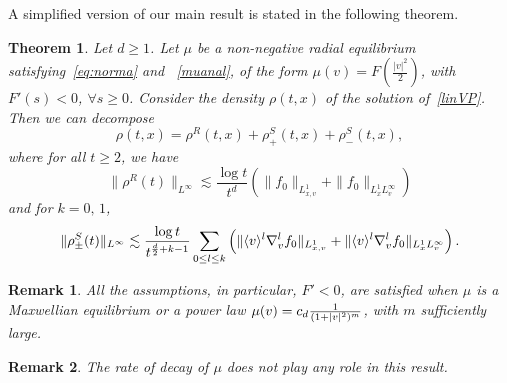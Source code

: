 \documentclass[11pt]{amsart}
\numberwithin{equation}{section}
\newcommand{\R}{\mathbb{R}}
\newtheorem{thm}{Theorem}[section]
\newtheorem{rem}{Remark}[section]
\begin{document}
A simplified version of our main result is stated in the following theorem.
\begin{thm}
\label{thm1}
Let $d\geq 1$. Let $\mu$ be a non-negative radial equilibrium satisfying~\eqref{eq:norma} and ~\eqref{muanal}, of the form
$\mu(v) = F\left(\frac{|v|^2}{2}\right)$, with $F'(s) <0$, $\forall s \geq 0$.
%
Consider the density   $\rho(t,x)$ of  the solution of~\eqref{linVP}.
Then we can decompose
$$ \rho(t,x) = \rho^{R}(t,x) + \rho^S_{+}(t,x) + \rho^S_{-}(t,x),$$ 
where for all $t\geq 2$, we have
 $$   \| \rho^{R} (t)  \|_{L^\infty} \lesssim  \frac{\log t}{t^d} \left( \|f_{0}\|_{L^1_{x,v}} +   \|f_{0}\|_{L^1_{x}L^\infty_{v}}  \right)$$
  and for $k=0, \, 1$, 
$$   \|\rho^S_{\pm}(t) \|_{L^\infty} \lesssim \frac{\log t}{t^{{d \over 2} +k-1} } \sum_{0 \leq l \leq k} \left( 
\| \langle v \rangle^l \nabla_{v}^lf_{0}\|_{L^1_{x,v}} +   \| \langle v \rangle^l  \nabla_{v}^l f_{0}\|_{L^1_{x}L^\infty_{v}}  \right).
$$

\end{thm}

\begin{rem}
All the assumptions,   in particular, $F'<0$,  are   satisfied   when $\mu$  is a  Maxwellian equilibrium  or  a power law
 $\mu(v)= c_{d} {1 \over (1 + |v|^2)^m}$, with $m$ sufficiently large.

\end{rem}

\begin{rem}
The rate of decay of $\mu$ does not play any role in this result.
\end{rem}
\end{document}
